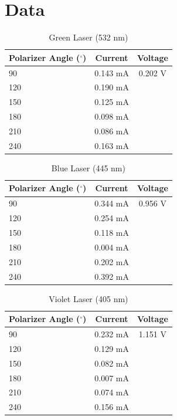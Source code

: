\documentclass{article}[12pt]
\begin{document}
\section{Data}

\begin{table}[H]
\centering
\begin{tabular}{| l | c | c | }

\hline
Polarizer Angle ($ {}^{\circ} $) & Current	& Voltage\\
\hline \hline
90  & 0.143 mA    & 0.202 V \\ \hline
120	&	0.190 mA		&	 \\ 	\hline
150	&	0.125 mA		&	 \\ 	\hline
180 &	0.098 mA		&	 \\	\hline
210 & 0.086 mA    &  \\ \hline
240 & 0.163 mA    &  \\ \hline

\end{tabular}
\caption{Green Laser (532 nm)}
\label{green}
\end{table}

\begin{table}[H]
\centering
\begin{tabular}{| l | c | c | }

\hline
Polarizer Angle ($ {}^{\circ} $) & Current	& Voltage\\
\hline \hline
90  & 0.344 mA    & 0.956 V \\ \hline
120	&	0.254 mA		&	 \\ 	\hline
150	&	0.118 mA		&	 \\ 	\hline
180 &	0.004 mA		&	 \\	\hline
210 & 0.202 mA    &  \\ \hline
240 & 0.392 mA    &  \\ \hline

\end{tabular}
\caption{Blue Laser (445 nm)}
\label{blue}
\end{table}

\begin{table}[H]
\centering
\begin{tabular}{| l | c | c | }

\hline
Polarizer Angle ($ {}^{\circ} $) & Current	& Voltage\\
\hline \hline
90  & 0.232 mA    & 1.151 V \\ \hline
120	&	0.129 mA		&	\\ 	\hline
150	&	0.082 mA		&	\\ 	\hline
180 &	0.007 mA		&	\\	\hline
210 & 0.074 mA    & \\ \hline
240 & 0.156 mA    & \\ \hline

\end{tabular}
\caption{Violet Laser (405 nm)}
\label{violet}
\end{table}
\end{document}
